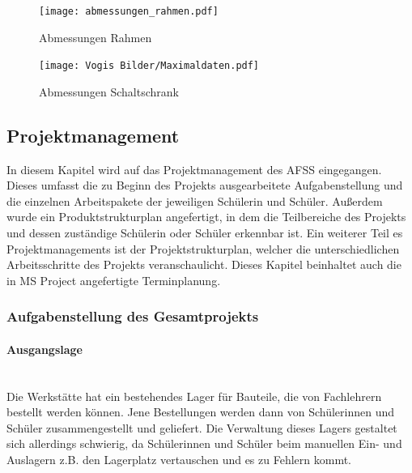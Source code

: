 \begin{figure}[H]
    \texttt{[image: abmessungen\_rahmen.pdf]}
    \centering
    \caption{Abmessungen Rahmen}
\end{figure}
\begin{figure}[H]
    \texttt{[image: Vogis Bilder/Maximaldaten.pdf]}
    \centering
    \caption{Abmessungen Schaltschrank}
\end{figure}


\subsection{Projektmanagement}
In diesem Kapitel wird auf das Projektmanagement des AFSS eingegangen. Dieses umfasst die zu Beginn des Projekts ausgearbeitete Aufgabenstellung und die einzelnen Arbeitspakete der jeweiligen Schülerin und Schüler. Außerdem wurde ein Produktstrukturplan angefertigt, in dem die Teilbereiche des Projekts und dessen zuständige Schülerin oder Schüler erkennbar ist. Ein weiterer Teil es Projektmanagements ist der Projektstrukturplan, welcher die unterschiedlichen Arbeitsschritte des Projekts veranschaulicht. Dieses Kapitel beinhaltet auch die in MS Project angefertigte Terminplanung.

\subsubsection{Aufgabenstellung des Gesamtprojekts}
\paragraph{Ausgangslage}\mbox{}\\
Die Werkstätte hat ein bestehendes Lager für Bauteile, die von Fachlehrern bestellt werden können. Jene Bestellungen werden dann von Schülerinnen und Schüler zusammengestellt und geliefert. Die Verwaltung dieses Lagers gestaltet sich allerdings schwierig, da Schülerinnen und Schüler beim manuellen Ein- und Auslagern z.B. den Lagerplatz vertauschen und es zu Fehlern kommt.

